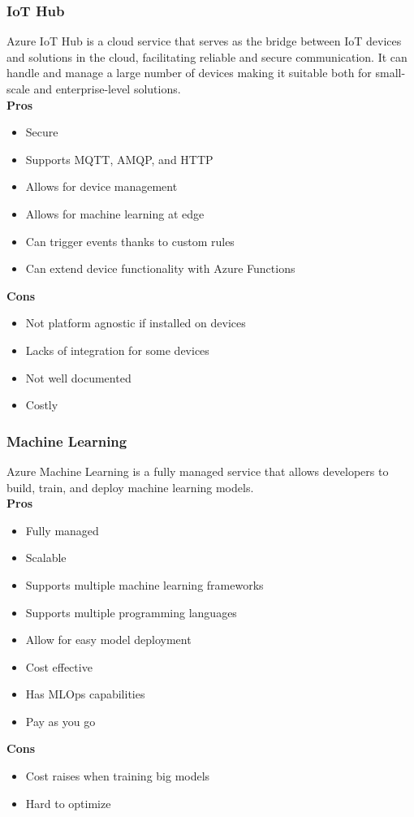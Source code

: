         \subsubsection{IoT Hub}
        \label{azure:iot-hub}
        Azure IoT Hub is a cloud service that serves as the bridge between IoT devices and solutions in the cloud, facilitating reliable and secure communication.
        It can handle and manage a large number of devices making it suitable both for small-scale and enterprise-level solutions.\\
        \textbf{Pros}
        \begin{itemize}
            \item Secure
            \item Supports MQTT, AMQP, and HTTP
            \item Allows for device management
            \item Allows for machine learning at edge
            \item Can trigger events thanks to custom rules
            \item Can extend device functionality with Azure Functions
        \end{itemize}
        \textbf{Cons}
        \begin{itemize}
            \item Not platform agnostic if installed on devices
            \item Lacks of integration for some devices
            \item Not well documented
            \item Costly
        \end{itemize}

        \subsubsection{Machine Learning}
        \label{azure:machine-learning}
        Azure Machine Learning is a fully managed service that allows developers to build, train, and deploy machine learning models.\\
        \textbf{Pros}
        \begin{itemize}
            \item Fully managed
            \item Scalable
            \item Supports multiple machine learning frameworks
            \item Supports multiple programming languages
            \item Allow for easy model deployment
            \item Cost effective
            \item Has MLOps capabilities
            \item Pay as you go
        \end{itemize}
        \textbf{Cons}
        \begin{itemize}
            \item Cost raises when training big models
            \item Hard to optimize 
        \end{itemize}

